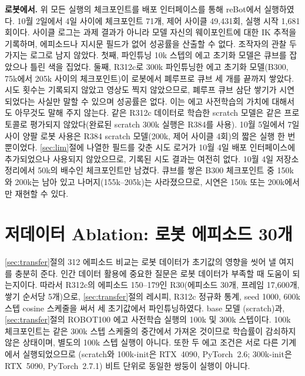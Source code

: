 \documentclass[conference,10pt]{IEEEtran}
\begin{document}
\textbf{로봇에서.} 위 모든 실행의 체크포인트를 배포 인터페이스를 통해 reBot에서 실행하였다. 10월 2일에서 4일 사이에 체크포인트 71개,
제어 사이클 49{,}431회, 실행 시작 1{,}681회이다. 사이클 로그는 과제 결과가 아니라 모델 자신의 웨이포인트에 대한 IK 추적을 기록하며,
에피소드나 지시문 필드가 없어 성공률을 산출할 수 없다. 조작자의 관찰 두 가지는 로그로 남지 않았다. 첫째, 파인튜닝 10k 스텝의 에고 초기화
모델은 큐브를 잡았으나 틀린 색을 집었다. 둘째, R312c로 300k 파인튜닝한 에고 초기화 모델(B300, 75k에서 205k 사이의 체크포인트)이
로봇에서 폐루프로 큐브 세 개를 끝까지 쌓았다. 시도 횟수는 기록되지 않았고 영상도 찍지 않았으므로, 폐루프 큐브 삼단 쌓기가 시연되었다는
사실만 말할 수 있으며 성공률은 없다. 이는 에고 사전학습의 가치에 대해서도 아무것도 말해 주지 않는다. 같은 R312c 데이터로 학습한
scratch 모델은 같은 프로토콜로 평가되지 않았다(완료된 scratch 300k 실행은 R384를 사용). 10월 5일에서 7일 사이 양팔 로봇 사용은 R384
scratch 모델(200k, 제어 사이클 4회)의 짧은 실행 한 번뿐이었다. \ref{sec:lim}절에 나열한 필드를 갖춘 시도 로거가 10월 4일 배포
인터페이스에 추가되었으나 사용되지 않았으므로, 기록된 시도 결과는 여전히 없다. 10월 4일 저장소 정리에서 50k의 배수인 체크포인트만
남겼다. 큐브를 쌓은 B300 체크포인트 중 150k와 200k는 남아 있고 나머지(155k--205k)는 사라졌으므로, 시연은 150k 또는 200k에서만 재현할
수 있다.

\section{저데이터 Ablation: 로봇 에피소드 30개}\label{sec:r30}
\ref{sec:transfer}절의 312 에피소드 비교는 로봇 데이터가 초기값의 영향을 씻어 낼 여지를 충분히 준다. 인간 데이터 활용에 중요한 질문은
로봇 데이터가 부족할 때 도움이 되는지이다. 따라서 R312c의 에피소드 150--179인 R30(에피소드 30개, 프레임 17{,}600개, 쌓기 순서당 5개)으로,
\ref{sec:transfer}절의 레시피, R312c 정규화 통계, seed 1000, 600k 스텝 cosine 스케줄을 써서 세 초기값에서 파인튜닝하였다. base 모델
(scratch)과, \ref{sec:transfer}절의 ROBOT100 에고 사전학습 실행의 100k 및 300k 스텝이다. 100k 체크포인트는 같은 300k 스텝 스케줄의 중간에서
가져온 것이므로 학습률이 감쇠하지 않은 상태이며, 별도의 100k 스텝 실행이 아니다. 또한 두 에고 조건은 서로 다른 기계에서 실행되었으므로
(scratch와 100k-init은 RTX~4090, PyTorch~2.6; 300k-init은 RTX~5090, PyTorch~2.7.1) 비트 단위로 동일한 쌍둥이 실행이 아니다.
\end{document}
